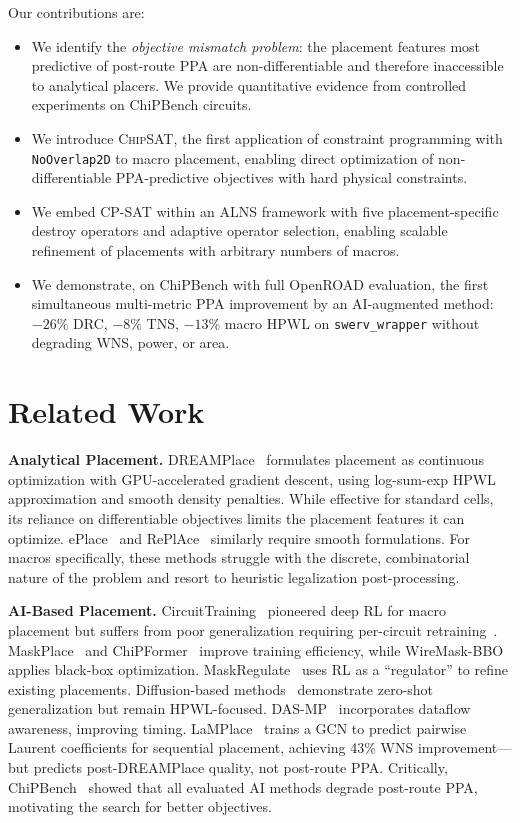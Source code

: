 \documentclass[sigconf,anonymous,review,9pt]{acmart}
\begin{document}
Our contributions are:
\begin{itemize}
    \item We identify the \emph{objective mismatch problem}: the placement features most predictive of post-route PPA are non-differentiable and therefore inaccessible to analytical placers. We provide quantitative evidence from controlled experiments on ChiPBench circuits.
    \item We introduce \textsc{ChipSAT}, the first application of constraint programming with \texttt{NoOverlap2D} to macro placement, enabling direct optimization of non-differentiable PPA-predictive objectives with hard physical constraints.
    \item We embed CP-SAT within an ALNS framework with five placement-specific destroy operators and adaptive operator selection, enabling scalable refinement of placements with arbitrary numbers of macros.
    \item We demonstrate, on ChiPBench with full OpenROAD evaluation, the first simultaneous multi-metric PPA improvement by an AI-augmented method: $-26\%$ DRC, $-8\%$ TNS, $-13\%$ macro HPWL on \texttt{swerv\_wrapper} without degrading WNS, power, or area.
\end{itemize}


\section{Related Work}
\label{sec:related}

\textbf{Analytical Placement.}
DREAMPlace~\cite{lin2019dreamplace} formulates placement as continuous optimization with GPU-accelerated gradient descent, using log-sum-exp HPWL approximation and smooth density penalties. While effective for standard cells, its reliance on differentiable objectives limits the placement features it can optimize. ePlace~\cite{lu2015eplace} and RePlAce~\cite{cheng2019replace} similarly require smooth formulations. For macros specifically, these methods struggle with the discrete, combinatorial nature of the problem and resort to heuristic legalization post-processing.

\textbf{AI-Based Placement.}
CircuitTraining~\cite{mirhoseini2021graph} pioneered deep RL for macro placement but suffers from poor generalization requiring per-circuit retraining~\cite{kahng2023reevaluating}. MaskPlace~\cite{lai2022maskplace} and ChiPFormer~\cite{lai2023chipformer} improve training efficiency, while WireMask-BBO~\cite{shi2023wire} applies black-box optimization. MaskRegulate~\cite{maskregulate2024} uses RL as a ``regulator'' to refine existing placements. Diffusion-based methods~\cite{lee2024chip} demonstrate zero-shot generalization but remain HPWL-focused. DAS-MP~\cite{dasmp2025} incorporates dataflow awareness, improving timing. LaMPlace~\cite{lamplace2025} trains a GCN to predict pairwise Laurent coefficients for sequential placement, achieving 43\% WNS improvement---but predicts post-DREAMPlace quality, not post-route PPA. Critically, ChiPBench~\cite{chipbench2025} showed that all evaluated AI methods degrade post-route PPA, motivating the search for better objectives.
\end{document}
